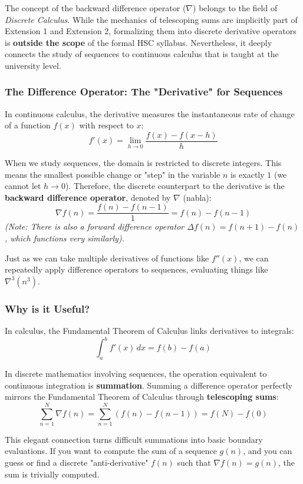 \begin{tcolorbox}[colback=blue!5!white,colframe=blue!75!black,title=Note on Syllabus]
The concept of the backward difference operator ($\nabla$) belongs to the field of \textit{Discrete Calculus}. While the mechanics of telescoping sums are implicitly part of Extension 1 and Extension 2, formalizing them into discrete derivative operators is \textbf{outside the scope} of the formal HSC syllabus. Nevertheless, it deeply connects the study of sequences to continuous calculus that is taught at the university level.
\end{tcolorbox}

\subsubsection*{The Difference Operator: The "Derivative" for Sequences}
In continuous calculus, the derivative measures the instantaneous rate of change of a function $f(x)$ with respect to $x$:
\[ f'(x) = \lim_{h \to 0} \frac{f(x) - f(x-h)}{h} \]

When we study sequences, the domain is restricted to discrete integers. This means the smallest possible change or "step" in the variable $n$ is exactly $1$ (we cannot let $h \to 0$). Therefore, the discrete counterpart to the derivative is the \textbf{backward difference operator}, denoted by $\nabla$ (nabla):
\[ \nabla f(n) = \frac{f(n) - f(n-1)}{1} = f(n) - f(n-1) \]
\textit{(Note: There is also a forward difference operator $\Delta f(n) = f(n+1) - f(n)$, which functions very similarly).}

Just as we can take multiple derivatives of functions like $f''(x)$, we can repeatedly apply difference operators to sequences, evaluating things like $\nabla^3(n^3)$. 

\subsubsection*{Why is it Useful?}
In calculus, the Fundamental Theorem of Calculus links derivatives to integrals:
\[ \int_a^b f'(x) \, dx = f(b) - f(a) \]

In discrete mathematics involving sequences, the operation equivalent to continuous integration is \textbf{summation}. Summing a difference operator perfectly mirrors the Fundamental Theorem of Calculus through \textbf{telescoping sums}:
\[ \sum_{n=1}^N \nabla f(n) = \sum_{n=1}^N (f(n) - f(n-1)) = f(N) - f(0) \]

This elegant connection turns difficult summations into basic boundary evaluations. If you want to compute the sum of a sequence $g(n)$, and you can guess or find a discrete "anti-derivative" $f(n)$ such that $\nabla f(n) = g(n)$, the sum is trivially computed.

